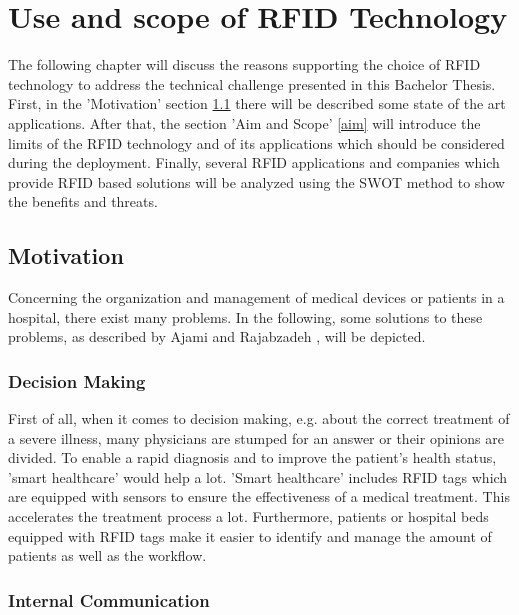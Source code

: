 \chapter{Use and scope of RFID Technology}
\label{Kap1}

The following chapter will discuss the reasons supporting the choice of \ac{RFID} technology to address the technical challenge presented in this Bachelor Thesis. First, in the 'Motivation' section \ref{motivation} there will be described some state of the art applications. After that, the section 'Aim and Scope' \ref{aim} will introduce the limits of the RFID technology and of its applications which should be considered during the deployment. Finally, several RFID applications and companies which provide RFID based solutions will be analyzed using the \ac{SWOT} method to show the benefits and threats.

\section{Motivation} \label{motivation}

Concerning the organization and management of medical devices or patients in a hospital, there exist many problems. In the following, some solutions to these problems, as described by Ajami and Rajabzadeh \cite{ncbi}, will be depicted.

\subsection{Decision Making}

First of all, when it comes to decision making, e.g. about the correct treatment of a severe illness, many physicians are stumped for an answer or their opinions are divided. To enable a rapid diagnosis and to improve the patient's health status, 'smart healthcare' \cite{henrici} would help a lot. 'Smart healthcare' includes RFID tags which are equipped with sensors to ensure the effectiveness of a medical treatment. This accelerates the treatment process a lot. Furthermore, patients or hospital beds equipped with RFID tags make it easier to identify and manage the amount of patients as well as the workflow.

\subsection{Internal Communication} \label{internalcomm}

